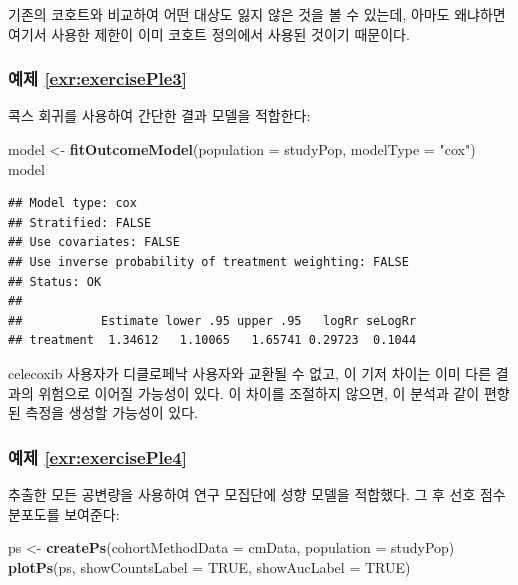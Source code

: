 \documentclass[10.5pt]{book}
\newenvironment{Shaded}{\begin{snugshade}}{\end{snugshade}}
\newcommand{\KeywordTok}[1]{\textcolor[rgb]{0.13,0.29,0.53}{\textbf{#1}}}
\newcommand{\DataTypeTok}[1]{\textcolor[rgb]{0.13,0.29,0.53}{#1}}
\newcommand{\StringTok}[1]{\textcolor[rgb]{0.31,0.60,0.02}{#1}}
\newcommand{\OtherTok}[1]{\textcolor[rgb]{0.56,0.35,0.01}{#1}}
\newcommand{\NormalTok}[1]{#1}
\theoremstyle{definition}
\theoremstyle{definition}
\theoremstyle{definition}
\theoremstyle{remark}
\begin{document}
기존의 코호트와 비교하여 어떤 대상도 잃지 않은 것을 볼 수 있는데, 아마도
왜냐하면 여기서 사용한 제한이 이미 코호트 정의에서 사용된 것이기
때문이다.

\subsubsection*{예제 \ref{exr:exercisePle3}}\label{-refexrexerciseple3}

콕스 회귀를 사용하여 간단한 결과 모델을 적합한다:

\begin{Shaded}
\begin{Highlighting}[]
\NormalTok{model <-}\StringTok{ }\KeywordTok{fitOutcomeModel}\NormalTok{(}\DataTypeTok{population =}\NormalTok{ studyPop,}
                         \DataTypeTok{modelType =} \StringTok{"cox"}\NormalTok{)}
\NormalTok{model}
\end{Highlighting}
\end{Shaded}

\begin{verbatim}
## Model type: cox
## Stratified: FALSE
## Use covariates: FALSE
## Use inverse probability of treatment weighting: FALSE
## Status: OK
## 
##           Estimate lower .95 upper .95   logRr seLogRr
## treatment  1.34612   1.10065   1.65741 0.29723  0.1044
\end{verbatim}

celecoxib 사용자가 디클로페낙 사용자와 교환될 수 없고, 이 기저 차이는
이미 다른 결과의 위험으로 이어질 가능성이 있다. 이 차이를 조절하지
않으면, 이 분석과 같이 편향된 측정을 생성할 가능성이 있다.

\subsubsection*{예제 \ref{exr:exercisePle4}}\label{-refexrexerciseple4}

추출한 모든 공변량을 사용하여 연구 모집단에 성향 모델을 적합했다. 그 후
선호 점수 분포도를 보여준다:

\begin{Shaded}
\begin{Highlighting}[]
\NormalTok{ps <-}\StringTok{ }\KeywordTok{createPs}\NormalTok{(}\DataTypeTok{cohortMethodData =}\NormalTok{ cmData,}
               \DataTypeTok{population =}\NormalTok{ studyPop)}
\KeywordTok{plotPs}\NormalTok{(ps, }\DataTypeTok{showCountsLabel =} \OtherTok{TRUE}\NormalTok{, }\DataTypeTok{showAucLabel =} \OtherTok{TRUE}\NormalTok{)}
\end{Highlighting}
\end{Shaded}
\end{document}
